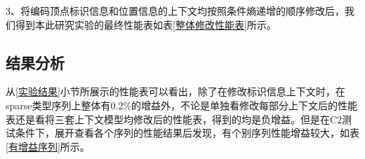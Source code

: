 \documentclass[bachelor,print,msfonts]{xduthesis}
\begin{document}
{
\scriptsize
\begin{table}[h]
    \fontsize{10.5pt}{15pt}\selectfont
    \centering
    \caption{\label{整体修改性能表} 整体修改性能表}
\end{table}
}

3、将编码顶点标识信息和位置信息的上下文均按照条件熵递增的顺序修改后，我们得到本此研究实验的最终性能表如表\ref{整体修改性能表}所示。

\subsection{结果分析}
从\ref{实验结果}小节所展示的性能表可以看出，除了在修改标识信息上下文时，在sparse类型序列上整体有0.2\%的增益外，不论是单独看修改每部分上下文后的性能表还是看将三套上下文模型均修改后的性能表，得到的均是负增益。但是在C2测试条件下，展开查看各个序列的性能结果后发现，有个别序列性能增益较大，如表\ref{有增益序列}所示。
\end{document}
